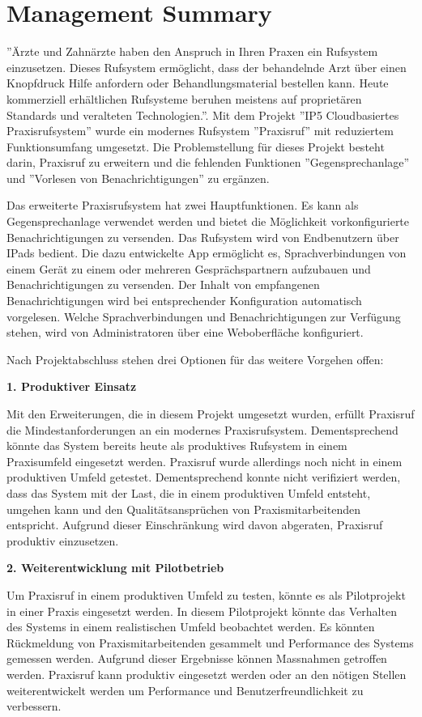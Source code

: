 \section*{Management Summary}

''Ärzte und Zahnärzte haben den Anspruch in Ihren Praxen ein Rufsystem einzusetzen.
Dieses Rufsystem ermöglicht, dass der behandelnde Arzt über einen Knopfdruck Hilfe anfordern oder Behandlungsmaterial bestellen kann.
Heute kommerziell erhältlichen Rufsysteme beruhen meistens auf proprietären Standards und veralteten Technologien.''\cite{aufgabenstellung}.
Mit dem Projekt ''IP5 Cloudbasiertes Praxisrufsystem'' wurde ein modernes Rufsystem ''Praxisruf'' mit reduziertem Funktionsumfang umgesetzt.
Die Problemstellung für dieses Projekt besteht darin, Praxisruf zu erweitern und die fehlenden Funktionen ''Gegensprechanlage'' und ''Vorlesen von Benachrichtigungen'' zu ergänzen.

Das erweiterte Praxisrufsystem hat zwei Hauptfunktionen.
Es kann als Gegensprechanlage verwendet werden und bietet die Möglichkeit vorkonfigurierte Benachrichtigungen zu versenden.
Das Rufsystem wird von Endbenutzern über IPads bedient.
Die dazu entwickelte App ermöglicht es, Sprachverbindungen von einem Gerät zu einem oder mehreren Gesprächspartnern aufzubauen und Benachrichtigungen zu versenden.
Der Inhalt von empfangenen Benachrichtigungen wird bei entsprechender Konfiguration automatisch vorgelesen.
Welche Sprachverbindungen und Benachrichtigungen zur Verfügung stehen, wird von Administratoren über eine Weboberfläche konfiguriert.

Nach Projektabschluss stehen drei Optionen für das weitere Vorgehen offen:

\textbf{1. Produktiver Einsatz}

Mit den Erweiterungen, die in diesem Projekt umgesetzt wurden, erfüllt Praxisruf die Mindestanforderungen an ein modernes Praxisrufsystem.
Dementsprechend könnte das System bereits heute als produktives Rufsystem in einem Praxisumfeld eingesetzt werden.
Praxisruf wurde allerdings noch nicht in einem produktiven Umfeld getestet.
Dementsprechend konnte nicht verifiziert werden, dass das System mit der Last, die in einem produktiven Umfeld entsteht, umgehen kann und den Qualitätsansprüchen von Praxismitarbeitenden entspricht.
Aufgrund dieser Einschränkung wird davon abgeraten, Praxisruf produktiv einzusetzen.

\textbf{2. Weiterentwicklung mit Pilotbetrieb}

Um Praxisruf in einem produktiven Umfeld zu testen, könnte es als Pilotprojekt in einer Praxis eingesetzt werden.
In diesem Pilotprojekt könnte das Verhalten des Systems in einem realistischen Umfeld beobachtet werden.
Es könnten Rückmeldung von Praxismitarbeitenden gesammelt und Performance des Systems gemessen werden.
Aufgrund dieser Ergebnisse können Massnahmen getroffen werden.
Praxisruf kann produktiv eingesetzt werden oder an den nötigen Stellen weiterentwickelt werden um Performance und Benutzerfreundlichkeit zu verbessern.


